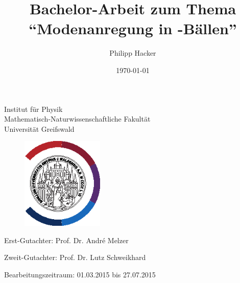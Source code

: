 \documentclass[numbers=noenddot,a4paper,notitlepage,twoside,BCOR15mm]{scrbook}
\title{Bachelor-Arbeit zum Thema \enquote{Modenanregung in \tilt{Yukawa}-Bällen}} %
\author{Philipp Hacker} %
\date{\today}
\begin{document}
	\maketitle

	\begin{center}

		Institut für Physik\\
		Mathematisch-Naturwissenschaftliche Fakultät\\
		Universität Greifswald

	\end{center}
	
	\vspace{0.5cm}

	\begin{figure}[H]
			\centering
			\includegraphics[width=0.35\textwidth]{figs/unilogo_NEU_schwarz.eps}
	\end{figure}

	\vspace{0.5cm}

	\begin{center}

			\hspace{-0.55cm} Erst-Gutachter: Prof. Dr. André Melzer \\ \vspace{0.25cm} %

			Zweit-Gutachter: Prof. Dr. Lutz Schweikhard \\ \vspace{0.25cm} %

			Bearbeitungszeitraum: 01.03.2015 bis 27.07.2015 \\ \vspace{0.25cm} %

%			
%			

	\end{center}
\end{document}
